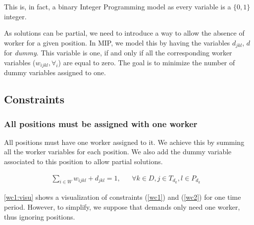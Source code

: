 \documentclass[../../thesis.tex]{subfiles}
\begin{document}
This is, in fact, a binary Integer Programming model as every variable is a $\{0, 1\}$ integer.

As solutions can be partial, we need to introduce a way to allow the absence of worker for a 
given position. In MIP, we model this by having the variables $d_{jkl}$, $d$ for \emph{dummy}. This variable is one, if and only if all the 
corresponding worker variables ($w_{ijkl}, \forall_i$) are equal to zero. The goal is to minimize 
the number of dummy variables assigned to one.

\subsection{Constraints}

\subsubsection{All positions must be assigned with one worker}

  All positions must have one worker assigned to it. We achieve this by summing all the worker variables 
  for each position. We also add the dummy variable associated to this position to allow partial 
  solutions.

  \begin{align}
    \sum_{i \in W} w_{ijkl} + d_{jkl} = 1, && \forall k \in D, j \in T_{d_k}, l \in P_{d_k} & \label{wc1}
  \end{align}


\autoref{wc1:visu} shows a visualization of constraints (\ref{wc1}) and (\ref{wc2}) for one time period.
However, to simplify, we suppose that demands only need one worker, thus ignoring positions.
\end{document}
